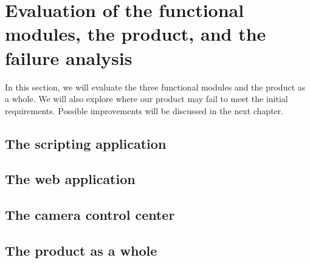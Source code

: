 \section{Evaluation of the functional modules, the product, and the failure analysis}

In this section, we will evaluate the three functional modules and the product as a whole. We will also explore where our product may fail to meet the initial requirements. Possible improvements will be discussed in the next chapter.\\

\subsection*{The scripting application}


\subsection*{The web application}

\subsection*{The camera control center}

\subsection*{The product as a whole}